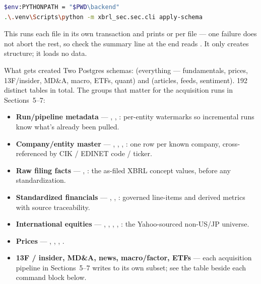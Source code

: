 \documentclass[11pt]{article}
\begin{document}
\begin{lstlisting}[language=bash]
$env:PYTHONPATH = "$PWD\backend"
.\.venv\Scripts\python -m xbrl_sec.sec.cli apply-schema
\end{lstlisting}

This runs each file in its own transaction and prints  or
 per file --- one failure does not abort the rest, so check
the summary line at the end reads . It only creates structure; it loads no
data.

\begin{modelbox}{What gets created}
Two Postgres schemas:  (everything --- fundamentals, prices, 13F/insider, MD\&A,
macro, ETFs, quant) and  (articles, feeds, sentiment). 192 distinct tables in
total. The groups that matter for the acquisition runs in Sections~5--7:

\begin{itemize}
  \item \textbf{Run/pipeline metadata} --- , ,
        : per-entity watermarks so incremental runs know what's
        already been pulled.
  \item \textbf{Company/entity master} --- , ,
        , : one row per known company,
        cross-referenced by CIK / EDINET code / ticker.
  \item \textbf{Raw filing facts} --- , :
        the as-filed XBRL concept values, before any standardization.
  \item \textbf{Standardized financials} --- ,
        , : governed
        line-items and derived metrics with source traceability.
  \item \textbf{International equities} --- ,
        , , ,
        : the Yahoo-sourced non-US/JP universe.
  \item \textbf{Prices} --- , ,
        , .
  \item \textbf{13F / insider, MD\&A, news, macro/factor, ETFs} --- each acquisition
        pipeline in Sections~5--7 writes to its own subset; see the table beside each
        command block below.
\end{itemize}
\end{modelbox}
\end{document}
